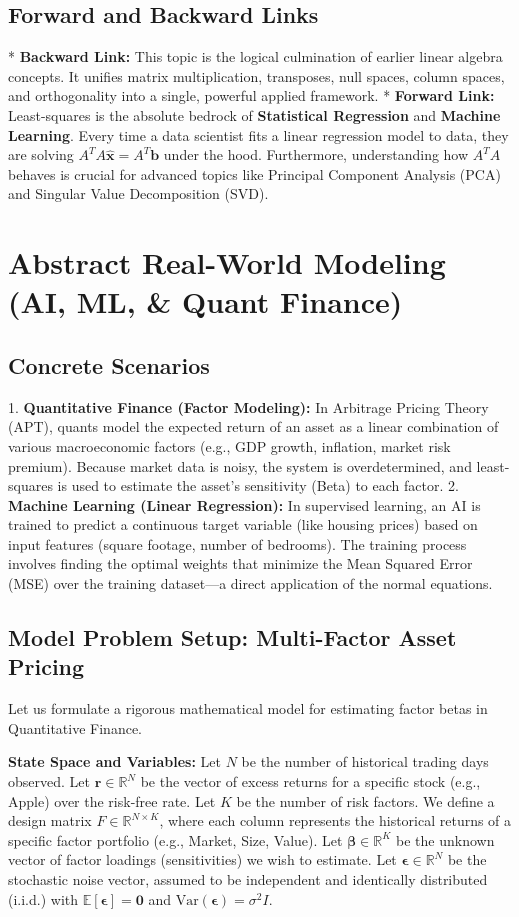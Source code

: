 \documentclass[11pt, letterpaper]{article}
\theoremstyle{definition}
\theoremstyle{remark}
\newcommand{\R}{\mathbb{R}}
\newcommand{\E}{\mathbb{E}}
\begin{document}
\subsection{Forward and Backward Links}
*   \textbf{Backward Link:} This topic is the logical culmination of earlier linear algebra concepts. It unifies matrix multiplication, transposes, null spaces, column spaces, and orthogonality into a single, powerful applied framework.
*   \textbf{Forward Link:} Least-squares is the absolute bedrock of \textbf{Statistical Regression} and \textbf{Machine Learning}. Every time a data scientist fits a linear regression model to data, they are solving $A^T A \hat{\mathbf{x}} = A^T \mathbf{b}$ under the hood. Furthermore, understanding how $A^T A$ behaves is crucial for advanced topics like Principal Component Analysis (PCA) and Singular Value Decomposition (SVD).

\section{Abstract Real-World Modeling (AI, ML, \& Quant Finance)}

\subsection{Concrete Scenarios}
1. \textbf{Quantitative Finance (Factor Modeling):} In Arbitrage Pricing Theory (APT), quants model the expected return of an asset as a linear combination of various macroeconomic factors (e.g., GDP growth, inflation, market risk premium). Because market data is noisy, the system is overdetermined, and least-squares is used to estimate the asset's sensitivity (Beta) to each factor.
2. \textbf{Machine Learning (Linear Regression):} In supervised learning, an AI is trained to predict a continuous target variable (like housing prices) based on input features (square footage, number of bedrooms). The training process involves finding the optimal weights that minimize the Mean Squared Error (MSE) over the training dataset—a direct application of the normal equations.

\subsection{Model Problem Setup: Multi-Factor Asset Pricing}
Let us formulate a rigorous mathematical model for estimating factor betas in Quantitative Finance.

\textbf{State Space and Variables:}
Let $N$ be the number of historical trading days observed.
Let $\mathbf{r} \in \R^N$ be the vector of excess returns for a specific stock (e.g., Apple) over the risk-free rate.
Let $K$ be the number of risk factors. We define a design matrix $F \in \R^{N \times K}$, where each column represents the historical returns of a specific factor portfolio (e.g., Market, Size, Value).
Let $\boldsymbol{\beta} \in \R^K$ be the unknown vector of factor loadings (sensitivities) we wish to estimate.
Let $\boldsymbol{\epsilon} \in \R^N$ be the stochastic noise vector, assumed to be independent and identically distributed (i.i.d.) with $\E[\boldsymbol{\epsilon}] = \mathbf{0}$ and $\text{Var}(\boldsymbol{\epsilon}) = \sigma^2 I$.
\end{document}
